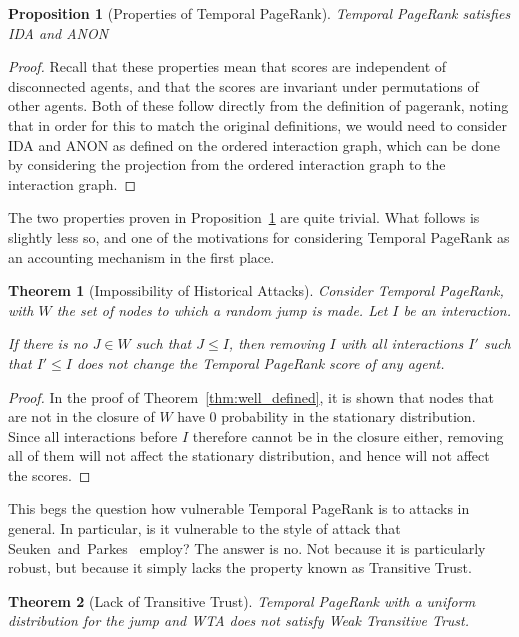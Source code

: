 \documentclass[a4paper,11pt]{book}
\newtheorem{theorem}{Theorem}
\newtheorem{proposition}{Proposition}
\theoremstyle{definition}
\begin{document}
\begin{proposition}[Properties of Temporal PageRank]
    Temporal PageRank satisfies IDA and ANON  
    \label{prop:prop_temp_pr}
\end{proposition}

\begin{proof}
    Recall that these properties mean that scores are independent of disconnected agents, and that
    the scores are invariant under permutations of other agents. Both of these follow directly
    from the definition of pagerank, noting that in order for this to match the original definitions,
    we would need to consider IDA and ANON as defined on the ordered interaction graph, which can
    be done by considering the projection from the ordered interaction graph to the interaction graph.
\end{proof}

The two properties proven in Proposition~\ref{prop:prop_temp_pr} are quite trivial. What follows
is slightly less so, and one of the motivations for considering Temporal PageRank as an accounting
mechanism in the first place.

\begin{theorem}[Impossibility of Historical Attacks]
    Consider Temporal PageRank, with $W$ the set of nodes to which a random jump is made. Let
    $I$ be an interaction.

    If there is no $J \in W$ such that $J \leq I$, then removing $I$ with all
    interactions $I'$ such that $I' \leq I$ does not change the Temporal PageRank
    score of any agent.
    \label{}
\end{theorem}

\begin{proof}
    In the proof of Theorem~\ref{thm:well_defined}, it is shown that nodes that are not in the closure
    of $W$ have $0$ probability in the stationary distribution. Since all interactions before $I$ therefore
    cannot be in the closure either, removing all of them will not affect the stationary distribution, and
    hence will not affect the scores.
\end{proof}

This begs the question how vulnerable Temporal PageRank is to attacks in general. In particular, is
it vulnerable to the style of attack that Seuken~and~Parkes~\cite{seuken2014sybil} employ? The
answer is no. Not because it is particularly robust, but because it simply lacks the property
known as Transitive Trust.

\begin{theorem}[Lack of Transitive Trust]
    Temporal PageRank with a uniform distribution for the jump and WTA does not satisfy Weak Transitive Trust.
    \label{thm:no_trans_trust}
\end{theorem}
\end{document}
